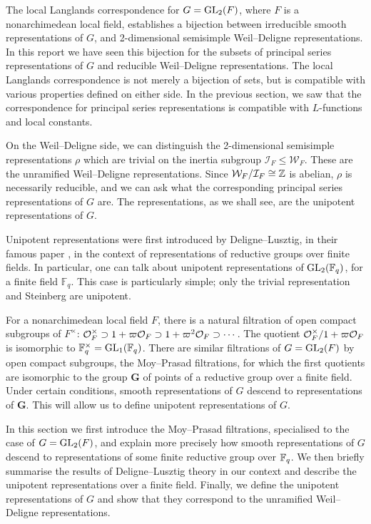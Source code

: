The local Langlands correspondence for $G=\mathrm{GL}_2(F)$, where $F$ is a nonarchimedean local field, establishes a bijection between irreducible smooth representations of $G$, and 2-dimensional semisimple Weil--Deligne representations. In this report we have seen this bijection for the subsets of principal series representations of $G$ and reducible Weil--Deligne representations. The local Langlands correspondence is not merely a bijection of sets, but is compatible with various properties defined on either side. In the previous section, we saw that the correspondence for principal series representations is compatible with $L$-functions and local constants. 

On the Weil--Deligne side, we can distinguish the 2-dimensional semisimple representations $\rho$ which are trivial on the inertia subgroup $\mathcal I_F \leq \mathcal W_F$. These are the unramified Weil--Deligne representations. Since $\mathcal W_F/\mathcal I_F \cong \mathbb{Z}$ is abelian, $\rho$ is necessarily reducible, and we can ask what the corresponding principal series representations of $G$ are. The representations, as we shall see, are the unipotent representations of $G$.

Unipotent representations were first introduced by Deligne--Lusztig, in their famous paper \cite{DL1}, in the context of representations of reductive groups over finite fields. In particular, one can talk about unipotent representations of $\mathrm{GL}_2(\mathbb F_q)$, for a finite field $\mathbb F_q$. This case is particularly simple; only the trivial representation and Steinberg are unipotent. 

For a nonarchimedean local field $F$, there is a natural filtration of open compact subgroups of $F^\times$: $\mathcal{O}_F^\times \supset 1+\varpi\mathcal{O}_F \supset 1+\varpi^2 \mathcal{O}_F \supset \cdots$. The quotient $\mathcal{O}_F^\times/1+\varpi\mathcal{O}_F$ is isomorphic to $\mathbb F_q^\times = \mathrm{GL}_1(\mathbb{F}_q)$. There are similar filtrations of $G=\mathrm{GL}_2(F)$ by open compact subgroups, the Moy--Prasad filtrations, for which the first quotients are isomorphic to the group $\mathbf{G}$ of points of a reductive group over a finite field. Under certain conditions, smooth representations of $G$ descend to representations of $\mathbf G$. This will allow us to define unipotent representations of $G$.

In this section we first introduce the Moy--Prasad filtrations, specialised to the case of $G=\mathrm{GL}_2(F)$, and explain more precisely how smooth representations of $G$ descend to representations of some finite reductive group over $\mathbb{F}_q$. We then briefly summarise the results of Deligne--Lusztig theory in our context and describe the unipotent representations over a finite field. Finally, we define the unipotent representations of $G$ and show that they correspond to the unramified Weil--Deligne representations.

